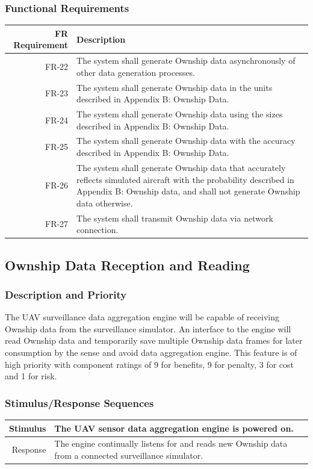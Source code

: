 \documentclass[12pt,oneside,letterpaper]{article}
\begin{document}
\subsubsection{Functional Requirements}
\begin{longtable}{|r|p{3.8in}|}
\hline
FR Requirement & Description \\
\hline
FR-22 & The system shall generate Ownship data asynchronously of other data generation processes. \\
\hline
FR-23 & The system shall generate Ownship data in the units described in Appendix B: Ownship Data. \\
\hline
FR-24 & The system shall generate Ownship data using the sizes described in Appendix B: Ownship Data. \\
\hline
FR-25 & The system shall generate Ownship data with the accuracy described in Appendix B: Ownship Data. \\
\hline
FR-26 & The system shall generate Ownship data that accurately reflects simulated aircraft with the probability described in Appendix B: Ownship data, and shall not generate Ownship data otherwise. \\
\hline
FR-27 & The system shall transmit Ownship data via network connection. \\
\hline
\end{longtable}

\subsection{Ownship Data Reception and Reading}
\subsubsection{Description and Priority}
The UAV surveillance data aggregation engine will be capable of receiving Ownship data from the surveillance simulator. An interface to the engine will read Ownship data and temporarily save multiple Ownship data frames for later consumption by the sense and avoid data aggregation engine. This feature is of high priority with component ratings of 9 for benefits, 9 for penalty, 3 for cost and 1 for risk.
\subsubsection{Stimulus/Response Sequences}
\begin{longtable}{|r|p{3.8in}|}
\hline
Stimulus & The UAV sensor data aggregation engine is powered on. \\
\hline
Response & The engine continually listens for and reads new Ownship data from a connected surveillance simulator. \\
\hline
\end{longtable}
\end{document}
